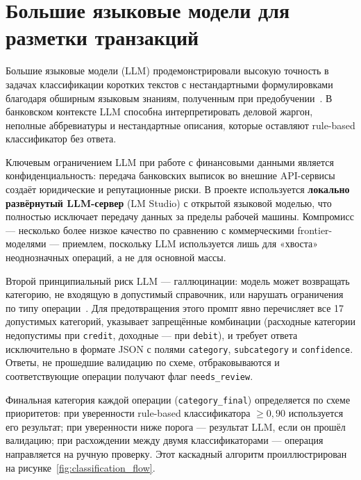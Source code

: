 \section{Большие языковые модели для разметки транзакций}

Большие языковые модели (LLM) продемонстрировали высокую точность в задачах классификации коротких текстов с нестандартными формулировками благодаря обширным языковым знаниям, полученным при предобучении~\cite{brown2020language}. В банковском контексте LLM способна интерпретировать деловой жаргон, неполные аббревиатуры и нестандартные описания, которые оставляют rule-based классификатор без ответа.

Ключевым ограничением LLM при работе с финансовыми данными является конфиденциальность: передача банковских выписок во внешние API-сервисы создаёт юридические и репутационные риски. В проекте используется \textbf{локально развёрнутый LLM-сервер} (LM Studio) с открытой языковой моделью, что полностью исключает передачу данных за пределы рабочей машины. Компромисс --- несколько более низкое качество по сравнению с коммерческими frontier-моделями --- приемлем, поскольку LLM используется лишь для «хвоста» неоднозначных операций, а не для основной массы.

Второй принципиальный риск LLM --- галлюцинации: модель может возвращать категорию, не входящую в допустимый справочник, или нарушать ограничения по типу операции~\cite{ji2023survey}. Для предотвращения этого промпт явно перечисляет все 17 допустимых категорий, указывает запрещённые комбинации (расходные категории недопустимы при \texttt{credit}, доходные --- при \texttt{debit}), и требует ответа исключительно в формате JSON с полями \texttt{category}, \texttt{subcategory} и \texttt{confidence}. Ответы, не прошедшие валидацию по схеме, отбраковываются и соответствующие операции получают флаг \texttt{needs\_review}.

Финальная категория каждой операции (\texttt{category\_final}) определяется по схеме приоритетов: при уверенности rule-based классификатора $\geq 0{,}90$ используется его результат; при уверенности ниже порога --- результат LLM, если он прошёл валидацию; при расхождении между двумя классификаторами --- операция направляется на ручную проверку. Этот каскадный алгоритм проиллюстрирован на рисунке~\ref{fig:classification_flow}.

